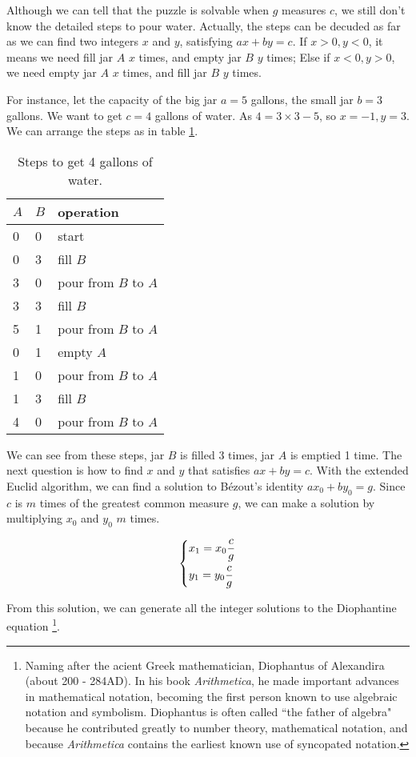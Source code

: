 \documentclass[b5paper]{article}
\begin{document}
Although we can tell that the puzzle is solvable when $g$ measures $c$, we still don't know the detailed steps to pour water. Actually, the steps can be decuded as far as we can find two integers $x$ and $y$, satisfying $ax + by = c$. If $x > 0, y < 0$, it means we need fill jar $A$ $x$ times, and empty jar $B$ $y$ times; Else if $x < 0, y > 0$, we need empty jar $A$ $x$ times, and fill jar $B$ $y$ times.

For instance, let the capacity of the big jar $a = 5$ gallons, the small jar $b = 3$ gallons. We want to get $c=4$ gallons of water. As $4 = 3 \times 3 - 5$, so $x = -1, y = 3$. We can arrange the steps as in table \ref{tab:designed-jugs-ops}.

\begin{table}[htbp]
\centering
\begin{tabular}{l|l|l}
$A$ & $B$ & operation \\
\hline
0 & 0 & start \\
0 & 3 & fill $B$ \\
3 & 0 & pour from $B$ to $A$ \\
3 & 3 & fill $B$ \\
5 & 1 & pour from $B$ to $A$ \\
0 & 1 & empty $A$ \\
1 & 0 & pour from $B$ to $A$ \\
1 & 3 & fill $B$ \\
4 & 0 & pour from $B$ to $A$ \\
\end{tabular}
\caption{Steps to get 4 gallons of water.} \label{tab:designed-jugs-ops}
\end{table}

We can see from these steps, jar $B$ is filled 3 times, jar $A$ is emptied 1 time. The next question is how to find $x$ and $y$ that satisfies $ax + by = c$. With the extended Euclid algorithm, we can find a solution to Bézout's identity $ax_0 + by_0 = g$. Since $c$ is $m$ times of the greatest common measure $g$, we can make a solution by multiplying $x_0$ and $y_0$ $m$ times.

\[
\begin{dcases}
  x_1 = x_0 \dfrac{c}{g} \\
  y_1 = y_0 \dfrac{c}{g}
\end{dcases}
\]

From this solution, we can generate all the integer solutions to the Diophantine equation \footnote{Naming after the acient Greek mathematician, Diophantus of Alexandira (about 200 - 284AD). In his book \textit{Arithmetica}, he made important advances in mathematical notation, becoming the first person known to use algebraic notation and symbolism. Diophantus is often called “the father of algebra" because he contributed greatly to number theory, mathematical notation, and because \textit{Arithmetica} contains the earliest known use of syncopated notation\cite{HanXueTao2009}.}.
\end{document}
